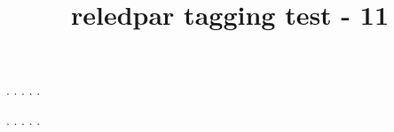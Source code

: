 \documentclass[a5paper,11pt]{article}
\title{reledpar tagging test - 11}
\begin{document}
\begin{pages}
    \begin{Leftside}
        \beginnumbering
            . \blindtext[21]
            \pend{}. \blindtext[10]
            \pend{}. \blindtext[6]
            \pend{}. \blindtext[6]
            \pend
            . \blindtext[6]
            \pend
        \endnumbering
    \end{Leftside}
    \begin{Rightside}
        \beginnumbering
            . \blindtext[22]\footnoteAmk
            \pend{}. \blindtext[12]
            \pend{}. \blindtext[12]
            \pend
            . \blindtext[12]
            \pend
            . \blindtext[12]
            \pend
        \endnumbering
    \end{Rightside}
\end{pages}
\Pages
\end{document}

